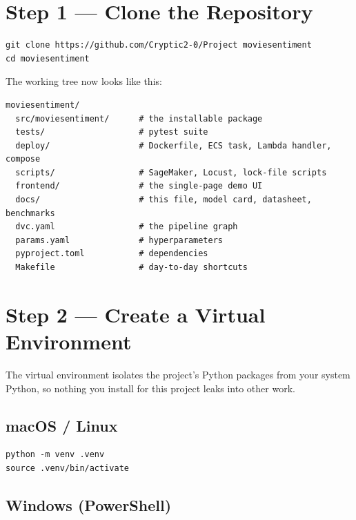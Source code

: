 \documentclass[11pt,a4paper]{article}
\begin{document}
\section{Step 1 --- Clone the Repository}

\begin{lstlisting}
git clone https://github.com/Cryptic2-0/Project moviesentiment
cd moviesentiment
\end{lstlisting}

\noindent The working tree now looks like this:

\begin{lstlisting}
moviesentiment/
  src/moviesentiment/      # the installable package
  tests/                   # pytest suite
  deploy/                  # Dockerfile, ECS task, Lambda handler, compose
  scripts/                 # SageMaker, Locust, lock-file scripts
  frontend/                # the single-page demo UI
  docs/                    # this file, model card, datasheet, benchmarks
  dvc.yaml                 # the pipeline graph
  params.yaml              # hyperparameters
  pyproject.toml           # dependencies
  Makefile                 # day-to-day shortcuts
\end{lstlisting}

\section{Step 2 --- Create a Virtual Environment}

The virtual environment isolates the project's Python packages from your system
Python, so nothing you install for this project leaks into other work.

\subsection{macOS / Linux}

\begin{lstlisting}
python -m venv .venv
source .venv/bin/activate
\end{lstlisting}

\subsection{Windows (PowerShell)}
\end{document}
